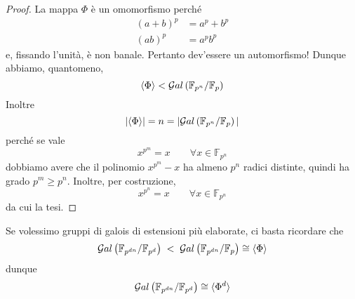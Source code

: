 \begin{multicols}{2}
	\begin{proof}
		La mappa $ \Phi $ è un omomorfismo perché
		\begin{align*}
		(a + b)^ p &= a^p + b^p \\
		(ab)^p &= a^p b^p
		\end{align*}
		e, fissando l'unità, è non banale. Pertanto dev'essere un automorfismo! Dunque abbiamo, quantomeno,
		\[ \langle \Phi \rangle < \mathcal{G}al\left( \mathbb{F}_{p^n} /\mathbb{F}_p \right) \]
		Inoltre
		\[ |\langle \Phi \rangle| = n = |\mathcal{G}al\left( \mathbb{F}_{p^n} /\mathbb{F}_p \right)| \]
		perché se vale
		\[ x^{p^m} = x \qquad\forall x \in \mathbb{F}_{p^n} \]
		dobbiamo avere che il polinomio $ x^{p^m} - x $ ha almeno $ p^n $ radici distinte, quindi ha grado $ p^m \geq p^n $. Inoltre, per costruzione,
		\[ x^{p^n} = x \qquad\forall x \in \mathbb{F}_{p^n} \]
		da cui la tesi.
	\end{proof}
	
	\begin{remark}
		Se volessimo gruppi di galois di estensioni più elaborate, ci basta ricordare che
		\[ \mathcal{G}al\left( \mathbb{F}_{p^{dn}} /\mathbb{F}_{p^d}  \right) \;<\; \mathcal{G}al\left( \mathbb{F}_{p^{dn}} /\mathbb{F}_p \right) \cong \langle \Phi \rangle \]
		dunque
		\[ \mathcal{G}al\left( \mathbb{F}_{p^{dn}} /\mathbb{F}_{p^d} \right) \cong \langle \Phi^d \rangle \]
	\end{remark}
\end{multicols}

